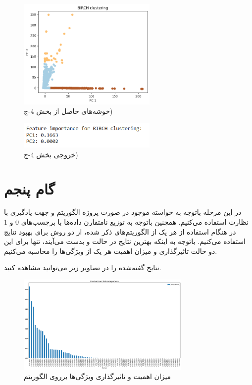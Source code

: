 \documentclass{article}
\begin{document}
\begin{figure}[ht]
        \centering
        \includegraphics[width=0.6\textwidth]{birch-clus.png}
        \caption{خوشه‌های حاصل از بخش 4-ج)}
        \label{fig:fig7}
\end{figure}

\begin{figure}[ht]
        \centering
        \includegraphics[width=0.6\textwidth]{birch-feature.png}
        \caption{خروجی بخش 4-ج)}
        \label{fig:fig8}
\end{figure}

\newpage
\section{گام پنجم}
در این مرحله باتوجه به خواسته موجود در صورت پروژه الگوریتم  و  جهت یادگیری با نظارت استفاده می‌کنیم. همچنین باتوجه به توزیع نامتقارن داده‌ها با برچسب‌های 0 و 1 در هنگام استفاده از هر یک از الگوریتم‌های ذکر شده، از دو روش برای بهبود نتایج استفاده می‌کنیم.
باتوجه به اینکه بهترین نتایج در حالت  و  بدست می‌آیند، تنها برای این دو حالت تاثیرگذاری و میزان اهمیت هر یک از ویژگی‌ها را محاسبه می‌کنیم.

نتایج گفته‌شده را در تصاویر زیر می‌توانید مشاهده کنید.
\begin{figure}[ht]
        \centering
        \includegraphics[width=0.75\textwidth]{random-forest-smote-importance.png}
        \caption{میزان اهمیت و تاثیرگذاری ویژگی‌ها برروی الگوریتم }
        \label{fig:fig9}
\end{figure}
\end{document}
